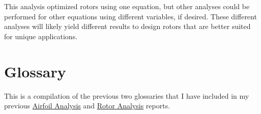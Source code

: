 \documentclass{article}
\begin{document}
 This analysis optimized rotors using one equation, but other analyses could be performed for other equations using different variables, if desired. These different analyses will likely yield different results to design rotors that are better suited for unique applications. \newline

\clearpage

\section{Glossary}

This is a compilation of the previous two glossaries that I have included in my previous \href{https://github.com/JoeSpencer1/497R-Projects/blob/Rotor-Analysis/Airfoil Analysis/Airfoil_Analysis.pdf}{Airfoil Analysis} and \href{https://github.com/JoeSpencer1/497R-Projects/blob/Rotor-Analysis/Rotor Analysis/Rotor_Analysis.pdf}{Rotor Analysis} reports.
\end{document}
